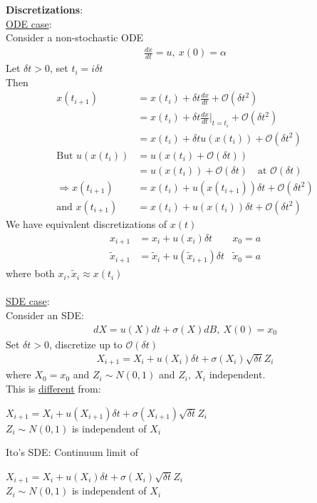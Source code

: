 \documentclass[12pt, letterpaper]{article}
\begin{document}
\textbf{Discretizations}:\\
\underline{ODE case}: \\
Consider a non-stochastic ODE 
\begin{align*}
    \frac{dx}{dt} = u,\ x(0) = \alpha
\end{align*}
Let $\delta t > 0$, set $t_i = i \delta t$ \\
Then 
\begin{align*}
    x(t_{i+1}) &= x(t_i) + \delta t \frac{dx}{dt} + \mathcal{O}(\delta t^2) \\
    &= x(t_i) + \delta t \frac{dx}{dt}\Big\vert_{t = t_i} + \mathcal{O}(\delta t^2)\\
    &= x(t_i) + \delta t u(x(t_i)) + \mathcal{O}(\delta t^2) \\
    \text{But } u(x(t_i)) &= u(x(t_i) + \mathcal{O}(\delta t)) \\
    &= u(x(t_i)) + \mathcal{O}(\delta t)\quad \text{at } \mathcal{O}(\delta t) \\
    \Rightarrow x(t_{i+1}) &= x(t_i) + u(x(t_{i+1})) \delta t + \mathcal{O}(\delta t^2) \\
    \text{and } x(t_{i+1}) &= x(t_i) + u(x(t_i))\delta t + \mathcal{O}(\delta t^2)
\end{align*}
We have equivalent discretizations of $x(t)$
\begin{align*}
    x_{i+1} &= x_i + u(x_i) \delta t &x_0 = a \\
    \tilde x_{i+1} &= \tilde x_i + u(\tilde x_{i+1}) \delta t &\tilde x_0 = a
\end{align*}
where both $x_i, \tilde x_i \approx x(t_i)$ \\ \\
\underline{SDE case}: \\
Consider an SDE:
\begin{align*}
    dX = u(X)dt + \sigma(X)dB,\ X(0) = x_0
\end{align*}
Set $\delta t > 0$, discretize up to $\mathcal{O}(\delta t)$
\begin{align*}
    X_{i+1} = X_i + u(X_i)\delta t + \sigma(X_i)\sqrt{\delta t} Z_i
\end{align*}
where $X_0 = x_0$ and $Z_i \sim N(0,1)$ and $Z_i,\ X_i$ independent. \\
This is \underline{different} from:
\begin{center}
    $X_{i+1} = X_i + u(X_{i+1})\delta t + \sigma(X_{i+1})\sqrt{\delta t} Z_i$ \\
    $Z_i \sim N(0,1)$ is independent of $X_i$
\end{center}
Ito's SDE: Continuum limit of 
\begin{center}
    $X_{i+1} = X_i + u(X_i)\delta t + \sigma(X_i) \sqrt{\delta t} Z_i$ \\
    $Z_i \sim N(0,1)$ is independent of $X_i$
\end{center}
 
\end{document}
